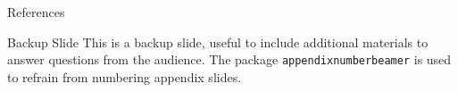 \documentclass{beamer}
\begin{document}
\appendix

\begin{frame}{References}
    \nocite{*} %
    
    
\end{frame}


\begin{frame}{Backup Slide}
    This is a backup slide, useful to include additional materials to answer questions from the audience.
    \vfill
    The package \texttt{appendixnumberbeamer} is used to refrain from numbering appendix slides.
\end{frame}

\end{document}
